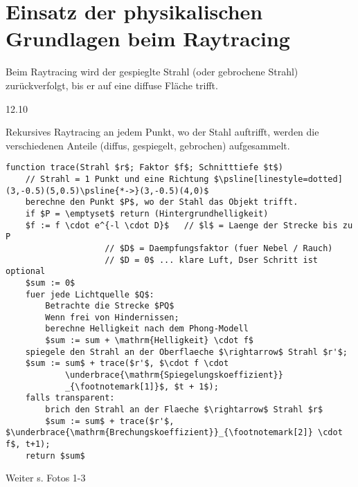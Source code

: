 \section{Einsatz der physikalischen Grundlagen beim Raytracing}
Beim Raytracing wird der gespieglte Strahl (oder gebrochene Strahl) zurückverfolgt,
bis er auf eine diffuse Fläche trifft.
\begin{center}
 12.10
\end{center}
Rekursives Raytracing an jedem Punkt, wo der Stahl auftrifft, werden die verschiedenen Anteile (diffus, gespiegelt,
gebrochen) aufgesammelt.
\begin{lstlisting}[morekeywords=function]
function trace(Strahl $r$; Faktor $f$; Schnitttiefe $t$)
	// Strahl = 1 Punkt und eine Richtung $\psline[linestyle=dotted](3,-0.5)(5,0.5)\psline{*->}(3,-0.5)(4,0)$
	berechne den Punkt $P$, wo der Stahl das Objekt trifft.
	if $P = \emptyset$ return (Hintergrundhelligkeit)
	$f := f \cdot e^{-l \cdot D}$	// $l$ = Laenge der Strecke bis zu P
					// $D$ = Daempfungsfaktor (fuer Nebel / Rauch)
					// $D = 0$ ... klare Luft, Dser Schritt ist optional
	$sum := 0$
	fuer jede Lichtquelle $Q$:
		Betrachte die Strecke $PQ$
		Wenn frei von Hindernissen;
		berechne Helligkeit nach dem Phong-Modell
		$sum := sum + \mathrm{Helligkeit} \cdot f$
	spiegele den Strahl an der Oberflaeche $\rightarrow$ Strahl $r'$;
	$sum := sum$ + trace($r'$, $\cdot f \cdot
			\underbrace{\mathrm{Spiegelungskoeffizient}}
			_{\footnotemark[1]}$, $t + 1$);
	falls transparent:
		brich den Strahl an der Flaeche $\rightarrow$ Strahl $r$
		$sum := sum$ + trace($r'$, $\underbrace{\mathrm{Brechungskoeffizient}}_{\footnotemark[2]} \cdot f$, t+1);
	return $sum$
\end{lstlisting}

Weiter s. Fotos 1-3